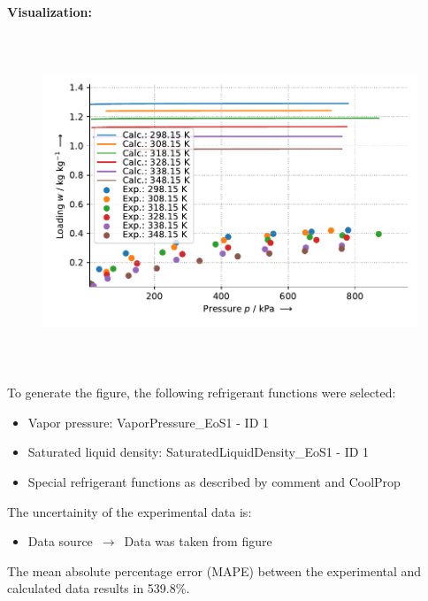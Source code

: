 \textbf{Visualization:}
%
\begin{figure}[!htp]
{\noindent\includegraphics[height=10cm, keepaspectratio]{figs/ads/ads_R-407c_activated_carbon_AquaSorb_2000_DubininAstakhov_1.pdf}}
\end{figure}
%

To generate the figure, the following refrigerant functions were selected:
\begin{itemize}
\item Vapor pressure: VaporPressure\_EoS1 - ID 1
\item Saturated liquid density: SaturatedLiquidDensity\_EoS1 - ID 1
\item Special refrigerant functions as described by comment and CoolProp
\end{itemize}

The uncertainity of the experimental data is:
\begin{itemize}
\item Data source $\,\to\,$ Data was taken from figure
\end{itemize}

The mean absolute percentage error (MAPE) between the experimental and calculated data results in 539.8\%.
\FloatBarrier
\newpage

